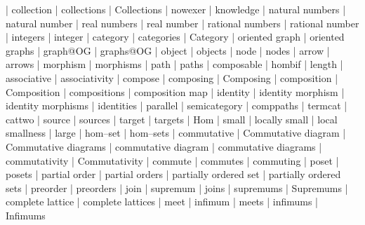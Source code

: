     |   collection
    |   collections
    |   Collections
    |   nowexer
    |   knowledge
    |   natural numbers
    |   natural number
    |   real numbers
    |   real number
    |   rational numbers
    |   rational number
    |   integers
    |   integer
    |   category
    |   categories
    |   Category
    |   oriented graph
    |   oriented graphs
    |   graph@OG
    |   graphs@OG
    |   object
    |   objects
    |   node
    |   nodes
    |   arrow
    |   arrows
    |   morphism
    |   morphisms
    |   path
    |   paths
    |   composable
    |   hombif
    |   length
    |   associative
    |   associativity
    |   compose
    |   composing
    |   Composing
    |   composition
    |   Composition
    |   compositions
    |   composition map
    |   identity
    |   identity morphism
    |   identity morphisms
    |   identities
    |   parallel
    |   semicategory
    |   comppaths
    |   termcat
    |   cattwo
    |   source
    |   sources
    |   target
    |   targets
    |   Hom
    |   small
    |   locally small
    |   local smallness
    |   large
    |   hom--set
    |   hom--sets
    |   commutative
    |   Commutative diagram
    |   Commutative diagrams
    |   commutative diagram
    |   commutative diagrams
    |   commutativity
    |   Commutativity
    |   commute
    |   commutes
    |   commuting
    |   poset
    |   posets
    |   partial order
    |   partial orders
    |   partially ordered set
    |   partially ordered sets
    |   preorder
    |   preorders
    |   join
    |   supremum
    |   joins
    |   supremums
    |   Supremums
    |   complete lattice
    |   complete lattices
    |   meet
    |   infimum
    |   meets
    |   infimums
    |   Infimums
